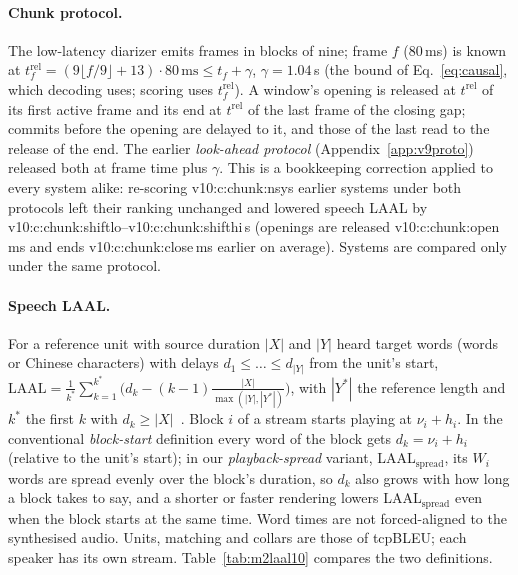 \paragraph{Chunk protocol.} The low-latency diarizer emits frames in blocks of nine; frame $f$ (80\,ms) is known at
$t^{\mathrm{rel}}_f=(9\lfloor f/9\rfloor+13)\cdot 80\,\text{ms}\le t_f+\gamma$, $\gamma=1.04$\,s (the bound of
Eq.~\eqref{eq:causal}, which decoding uses; scoring uses $t^{\mathrm{rel}}_f$). A window's opening is released at
$t^{\mathrm{rel}}$ of its first active frame and its end at $t^{\mathrm{rel}}$ of the last frame of the closing gap;
commits before the opening are delayed to it, and those of the last read to the release of the end. The earlier
\emph{look-ahead protocol} (Appendix~\ref{app:v9proto}) released both at frame time plus $\gamma$. This is a bookkeeping correction applied to every system alike: re-scoring \num{v10:c:chunk:nsys} earlier
systems under both protocols left their ranking unchanged and lowered speech LAAL by
\num{v10:c:chunk:shiftlo}--\num{v10:c:chunk:shifthi}\,s (openings are released \num{v10:c:chunk:open}\,ms and ends
\num{v10:c:chunk:close}\,ms earlier on average). Systems are compared only under the same protocol.

\paragraph{Speech LAAL.} For a reference unit with source duration $|X|$ and $|Y|$ heard target words (words or Chinese
characters) with delays $d_1\le\dots\le d_{|Y|}$ from the unit's start, $\mathrm{LAAL}=\frac{1}{k^\ast}\sum_{k=1}^{k^\ast}
\big(d_k-(k-1)\frac{|X|}{\max(|Y|,|Y^\ast|)}\big)$, with $|Y^\ast|$ the reference length and $k^\ast$ the first $k$ with
$d_k\ge|X|$~\citep{papi2022over}. Block $i$ of a stream starts playing at $\nu_i+h_i$. In the conventional
\emph{block-start} definition every word of the block gets $d_k=\nu_i+h_i$ (relative to the unit's start); in our
\emph{playback-spread} variant, LAAL$_\text{spread}$, its $W_i$ words are spread evenly over the block's duration, so
$d_k$ also grows with how long a block takes to say, and a shorter or faster rendering lowers LAAL$_\text{spread}$ even
when the block starts at the same time. Word times are not forced-aligned to the synthesised audio. Units, matching and
collars are those of tcpBLEU; each speaker has its own stream. Table~\ref{tab:m2laal10} compares the two definitions.



